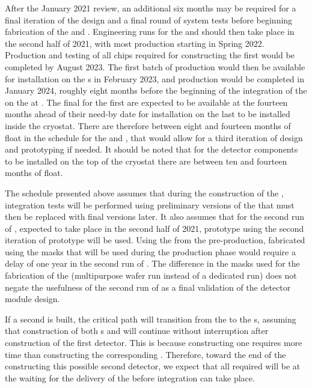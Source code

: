 After the January 2021 review, an additional six months may be 
required for a final iteration of the  design
and a final round of system tests before beginning fabrication
of the  and . Engineering runs
for the  and  should then take place in the
second half of 2021, with most production starting in
Spring 2022. Production and testing of all chips required
for constructing the first   
would be completed by August 2023. The first batch of
production  would then be available for installation on
the s in February 2023, and production would be
completed in January 2024, roughly eight months before the 
beginning of the integration of the  on the
 at . The final  for the 
first  are expected to be available at the  
fourteen months ahead of their need-by date for installation on the 
last  to be installed inside the cryostat.
There are therefore between eight and fourteen months of float
in the schedule for the  and , that 
would allow for a third iteration of design and prototyping
if needed. It should be noted that for the detector components
to be installed on the top of the cryostat there are between
ten and fourteen months of float.

The schedule presented above assumes that during the
construction of the ,
integration tests will be performed using preliminary
versions of the  that must then be replaced
with final versions later. It also assumes that for the
second run of , expected to take place in the
second half of 2021, prototype  using the
second iteration of prototype  will be used.
Using the  from the pre-production, fabricated using
the masks that will be used during the production phase 
would require a delay of one year in the second run of
. The difference in the masks used for the
fabrication of the  (multipurpose wafer run instead 
of a dedicated run) does not negate the usefulness of
the second run of  as a final validation of
the   detector module design.

If a second    is built, the critical
path will transition from the 
to the s, assuming that construction
of both s and  will continue 
without interruption after construction of the first detector. 
This is because constructing one  requires 
more time than constructing the corresponding . Therefore,
toward the end of the constructing this possible second detector,
we expect that all required  will be at the
 waiting for the delivery of the  before
integration can take place.

